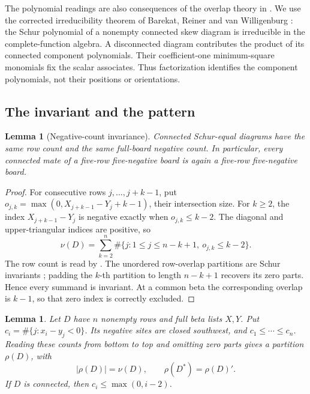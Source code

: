 \documentclass[11pt,a4paper]{amsart}
\numberwithin{equation}{section}
\theoremstyle{plain}
\newtheorem{lemma}[theorem]{Lemma}
\theoremstyle{definition}
\begin{document}
The polynomial readings are also consequences of the overlap theory in
\cite{Reiner2007Coincidences}.  We use the corrected irreducibility theorem
of Barekat, Reiner and van Willigenburg
\cite{Barekat2009CoincidencesCorrigendum}: the Schur polynomial of a
nonempty connected skew diagram is irreducible in the complete-function
algebra.  A disconnected diagram contributes the product of its connected
component polynomials.  Their coefficient-one minimum-square monomials
fix the scalar associates.  Thus factorization identifies the component
polynomials, not their positions or orientations.

\subsection{The invariant and the pattern}

\begin{lemma}[Negative-count invariance]\label{lem:five-mate-closure}
Connected Schur-equal diagrams have the same row count and the same
full-board negative count.  In particular, every connected mate of a
five-row five-negative board is again a five-row five-negative board.  
\end{lemma}

\begin{proof}
For consecutive rows \(j,\ldots,j+k-1\), put
\(o_{j,k}=\max(0,X_{j+k-1}-Y_j+k-1)\), their intersection size.  
For \(k\ge2\), the index \(X_{j+k-1}-Y_j\) is negative exactly
when \(o_{j,k}\le k-2\).  The diagonal and upper-triangular indices
are positive, so
\[
 \nu(D)=\sum_{k=2}^n
 \#\{j:1\le j\le n-k+1,\ o_{j,k}\le k-2\}.  
\]
The row count is read by .  The unordered row-overlap
partitions are Schur invariants \cite{Reiner2007Coincidences}; padding
the \(k\)-th partition to length \(n-k+1\) recovers its zero parts.  
Hence every summand is invariant.  At a common beta the corresponding
overlap is \(k-1\), so that zero index is correctly excluded.  
\end{proof}

\begin{lemma}\label{lem:negative-partition}
Let \(D\) have \(n\) nonempty rows and full beta lists \(X,Y\).
Put \(c_i=\#\{j:x_i-y_j<0\}\).  Its negative sites are closed
southwest, and \(c_1\le\cdots\le c_n\).  Reading these counts from
bottom to top and omitting zero parts gives a partition \(\rho(D)\),
with
\[
 |\rho(D)|=\nu(D),\qquad \rho(D^*)=\rho(D)' .
\]
If \(D\) is connected, then \(c_i\le\max(0,i-2)\).
\end{lemma}
\end{document}
